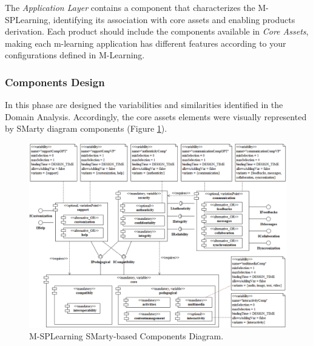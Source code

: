 The \textit{Application Layer} contains a component that characterizes the M-SPLearning, identifying its association with core assets and enabling products derivation. Each product should include the components available in \textit{Core Assets}, making each m-learning application has different features according to your configurations defined in M-Learning.

\subsubsection{Components Design}

In this phase are designed the variabilities and similarities identified in the Domain Analysis. Accordingly, the core assets elements were visually represented by SMarty diagram components (Figure \ref{figureMSPLDesign}).

\begin{figure}
\centering
\includegraphics[scale=0.4]{figures/section3/MSPLDesign}
\caption{M-SPLearning SMarty-based Components Diagram.}
\label{figureMSPLDesign}
\end{figure}

